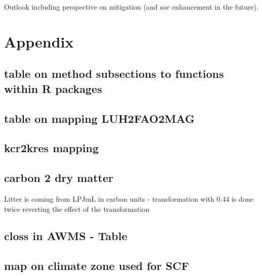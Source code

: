 \documentclass[gc, manuscript]{copernicus}
\begin{document}
\conclusions

Outlook including perspective on mitigation (and soc enhancement in the future).
\newpage

\hypertarget{appendix}{%
\section{Appendix}\label{appendix}}

\hypertarget{append:subsection2mrfunctions}{%
\subsection{table on method subsections to functions within R packages}\label{append:subsection2mrfunctions}}

\hypertarget{append:Tableluh2fao2mag}{%
\subsection{table on mapping LUH2FAO2MAG}\label{append:Tableluh2fao2mag}}

\hypertarget{append:Tablekcr2kres}{%
\subsection{kcr2kres mapping}\label{append:Tablekcr2kres}}

\hypertarget{append:Tablec2dm}{%
\subsection{carbon 2 dry matter}\label{append:Tablec2dm}}

Litter is coming from LPJmL in carbon units - transformation with 0.44 is done twice reverting the effect of the transformation

\hypertarget{append:TableclossAWMS}{%
\subsection{closs in AWMS - Table}\label{append:TableclossAWMS}}

\hypertarget{append:climatemap}{%
\subsection{map on climate zone used for SCF}\label{append:climatemap}}

\newpage




\end{document}
